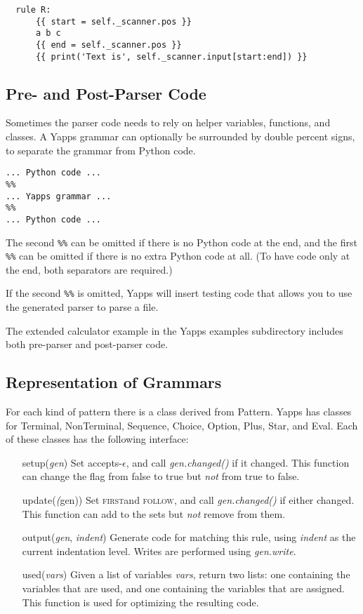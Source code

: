 \documentclass[10pt]{article}
\newcommand{\mysubsection}[1]{\subsection{#1}}
\newcommand{\first}{\textsc{first}}
\newcommand{\follow}{\textsc{follow}}
\begin{document}
\begin{verbatim}
  rule R: 
      {{ start = self._scanner.pos }}
      a b c 
      {{ end = self._scanner.pos }}
      {{ print('Text is', self._scanner.input[start:end]) }}
\end{verbatim}

\mysubsection{Pre- and Post-Parser Code}

Sometimes the parser code needs to rely on helper variables,
functions, and classes.  A Yapps grammar can optionally be surrounded
by double percent signs, to separate the grammar from Python code.

\begin{verbatim}
... Python code ...
%%
... Yapps grammar ...
%%
... Python code ...
\end{verbatim}

The second \verb|%%| can be omitted if there is no Python code at the
end, and the first \verb|%%| can be omitted if there is no extra
Python code at all.  (To have code only at the end, both separators
are required.)

If the second \verb|%%| is omitted, Yapps will insert testing code
that allows you to use the generated parser to parse a file.

The extended calculator example in the Yapps examples subdirectory
includes both pre-parser and post-parser code.

\mysubsection{Representation of Grammars}

For each kind of pattern there is a class derived from Pattern.  Yapps 
has classes for Terminal, NonTerminal, Sequence, Choice, Option, Plus, 
Star, and Eval.  Each of these classes has the following interface:

\begin{itemize}
 \item[setup(\emph{gen})] Set accepts-$\epsilon$, and call
   \emph{gen.changed()} if it changed.  This function can change the
   flag from false to true but \emph{not} from true to false.
 \item[update(\emph(gen))] Set \first and \follow, and call
   \emph{gen.changed()} if either changed.  This function can add to
   the sets but \emph{not} remove from them.
 \item[output(\emph{gen}, \emph{indent})] Generate code for matching
   this rule, using \emph{indent} as the current indentation level.
   Writes are performed using \emph{gen.write}.
 \item[used(\emph{vars})] Given a list of variables \emph{vars},
   return two lists: one containing the variables that are used, and
   one containing the variables that are assigned.  This function is
   used for optimizing the resulting code.
\end{itemize}
\end{document}
